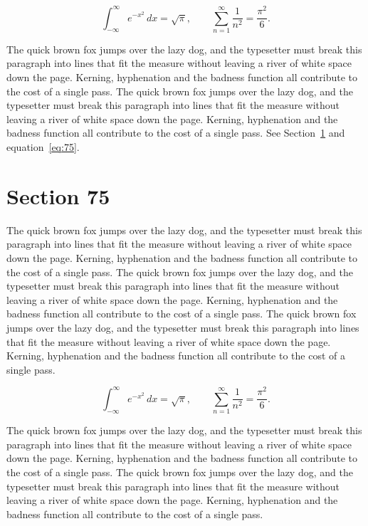 \documentclass{article}
\begin{document}
\begin{equation}\label{eq:74}
\int_{-\infty}^{\infty} e^{-x^{2}}\,dx = \sqrt{\pi}, \qquad
\sum_{n=1}^{\infty} \frac{1}{n^{2}} = \frac{\pi^{2}}{6}.
\end{equation}

The quick brown fox jumps over the lazy dog, and the typesetter must break this paragraph into lines that fit the measure without leaving a river of white space down the page. Kerning, hyphenation and the badness function all contribute to the cost of a single pass. The quick brown fox jumps over the lazy dog, and the typesetter must break this paragraph into lines that fit the measure without leaving a river of white space down the page. Kerning, hyphenation and the badness function all contribute to the cost of a single pass. 
See Section~\ref{sec:75} and equation~\eqref{eq:75}.
\section{Section 75}
\label{sec:75}
The quick brown fox jumps over the lazy dog, and the typesetter must break this paragraph into lines that fit the measure without leaving a river of white space down the page. Kerning, hyphenation and the badness function all contribute to the cost of a single pass. The quick brown fox jumps over the lazy dog, and the typesetter must break this paragraph into lines that fit the measure without leaving a river of white space down the page. Kerning, hyphenation and the badness function all contribute to the cost of a single pass. The quick brown fox jumps over the lazy dog, and the typesetter must break this paragraph into lines that fit the measure without leaving a river of white space down the page. Kerning, hyphenation and the badness function all contribute to the cost of a single pass. 

\begin{equation}\label{eq:75}
\int_{-\infty}^{\infty} e^{-x^{2}}\,dx = \sqrt{\pi}, \qquad
\sum_{n=1}^{\infty} \frac{1}{n^{2}} = \frac{\pi^{2}}{6}.
\end{equation}

The quick brown fox jumps over the lazy dog, and the typesetter must break this paragraph into lines that fit the measure without leaving a river of white space down the page. Kerning, hyphenation and the badness function all contribute to the cost of a single pass. The quick brown fox jumps over the lazy dog, and the typesetter must break this paragraph into lines that fit the measure without leaving a river of white space down the page. Kerning, hyphenation and the badness function all contribute to the cost of a single pass. 
\end{document}
